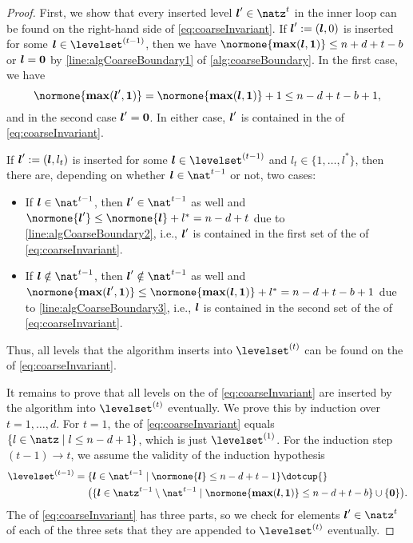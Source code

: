 \begin{proof}
  First, we show that every inserted level $\*l' \in \natz^t$ in the inner loop
  can be found on the right-hand side of \eqref{eq:coarseInvariant}.
  If ${\boldsymbol{l}}' := ({\boldsymbol{l}}, 0)$
  is inserted for some $\*l \in \levelset^{(t-1)}$,
  then we have $\normone{\vecmax(\*l, \*1)} \le n+d+t-b$ or
  ${\boldsymbol{l}} = {\boldsymbol{0}}$ by \cref{line:algCoarseBoundary1} of
  \cref{alg:coarseBoundary}.
  In the first case, we have
  \begin{equation}
    \normone{\vecmax(\*l', \*1)}
    = \normone{\vecmax(\*l, \*1)} + 1
    \le n - d + t - b + 1,
  \end{equation}
  and in the second case ${\boldsymbol{l}}' = {\boldsymbol{0}}$.
  In either case, ${\boldsymbol{l}}'$ is contained in the \rhs of
  \eqref{eq:coarseInvariant}.
  
  If ${\boldsymbol{l}}' := ({\boldsymbol{l}}, l_t)$ is inserted
  for some $\*l \in \levelset^{(t-1)}$ and
  $l_t \in \{1, \dotsc, l^\ast\}$, then there are,
  depending on whether $\*l \in \nat^{t-1}$ or not, two cases:
  \begin{itemize}
    \item
    If $\*l \in \nat^{t-1}$, then $\*l' \in \nat^{t-1}$ as well and
    $\normone{\*l'} \le \normone{\*l} + l^\ast = n - d + t$
    due to \cref{line:algCoarseBoundary2},
    i.e., ${\boldsymbol{l}}'$ is contained in the first set of the \rhs of
    \eqref{eq:coarseInvariant}.
    
    \item
    If $\*l \notin \nat^{t-1}$, then $\*l' \notin \nat^{t-1}$ as well and
    $\normone{\vecmax(\*l', \*1)}
    \le \normone{\vecmax(\*l, \*1)} + l^\ast
    = n - d + t - b + 1$
    due to \cref{line:algCoarseBoundary3},
    i.e., ${\boldsymbol{l}}$ is contained in the second set of the \rhs of
    \eqref{eq:coarseInvariant}.
  \end{itemize}
  Thus, all levels that the algorithm inserts into $\levelset^{(t)}$
  can be found on the \rhs of \eqref{eq:coarseInvariant}.
  
  It remains to prove that all levels on the \rhs of
  \eqref{eq:coarseInvariant}
  are inserted by the algorithm into $\levelset^{(t)}$ eventually.
  We prove this by induction over $t = 1, \dotsc, d$.
  For $t = 1$, the \rhs of \eqref{eq:coarseInvariant} equals
  $\{l \in \natz \mid l \le n-d+1\}$, which is just $\levelset^{(1)}$.
  For the induction step $(t - 1) \to t$, we assume
  the validity of the induction hypothesis
  \begin{equation}
    \label{eq:proofCoarseInductionHypothesis}
    \begin{aligned}
      \levelset^{(t-1)}
      &= \{\*l \in \nat^{t-1} \mid
      \normone{\*l} \le n-d+t-1\} \dotcup {}\\
      &\hphantom{{}={}}
      \big(\{\*l \in \natz^{t-1} \setminus \nat^{t-1} \mid
      \normone{\vecmax(\*l, \*1)} \le n-d+t-b\} \cup
      \{\vec{0}\}\big).
    \end{aligned}
  \end{equation}
  The \rhs of \eqref{eq:coarseInvariant} has three parts,
  so we check for elements $\*l' \in \natz^t$
  of each of the three sets that they are appended to $\levelset^{(t)}$
  eventually.
  

\end{proof}
